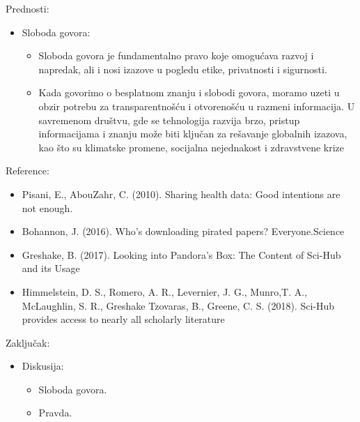 \documentclass[aspectratio=1610,17pt,utf8]{beamer}
\begin{document}
         \begin{frame}{Prednosti:}
		
		\begin{itemize}
			\item Sloboda govora:
			\begin{itemize}
				\item Sloboda govora je fundamentalno pravo koje omogućava razvoj i napredak, ali i nosi izazove u pogledu etike, privatnosti i sigurnosti.
				\item Kada govorimo o besplatnom znanju i slobodi govora, moramo uzeti u obzir potrebu za transparentnošću i otvorenošću u razmeni informacija. U savremenom društvu, gde se tehnologija razvija brzo, pristup informacijama i znanju može biti ključan za rešavanje globalnih izazova, kao što su klimatske promene, socijalna nejednakost i zdravstvene krize
				
			\end{itemize}
		\end{itemize}
	\end{frame}


	\begin{frame}{Reference:}
		
		\begin{itemize}
			
			\begin{itemize}
				\item Pisani, E., AbouZahr, C. (2010). Sharing health data: Good intentions are not enough.
                    \item Bohannon, J. (2016). Who’s downloading pirated papers?         Everyone.Science
				\item Greshake, B. (2017). Looking into Pandora’s Box: The Content of Sci-Hub and its Usage
				\item Himmelstein, D. S., Romero, A. R., Levernier, J. G., Munro,T. A., McLaughlin, S. R., Greshake Tzovaras, B., Greene, C. S. (2018). Sci-Hub provides access to nearly all scholarly literature
			\end{itemize}
		\end{itemize}
	\end{frame}
    
	
	\begin{frame}{Zaključak:}
		
		\begin{itemize}
			\item Diskusija:
			\begin{itemize}
				\item Sloboda govora.
				\item Pravda.
				
				
			\end{itemize}
		\end{itemize}
	\end{frame}
	
	
	
\end{document}
